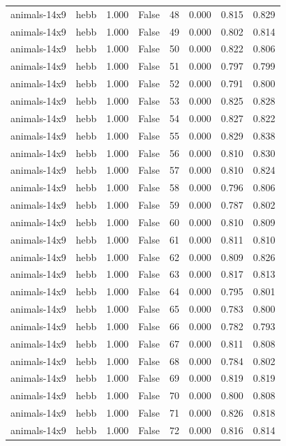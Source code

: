 \begin{tabular}{llrrrrrr}
animals-14x9 & hebb & 1.000 & False & 48 & 0.000 & 0.815 & 0.829 \\
animals-14x9 & hebb & 1.000 & False & 49 & 0.000 & 0.802 & 0.814 \\
animals-14x9 & hebb & 1.000 & False & 50 & 0.000 & 0.822 & 0.806 \\
animals-14x9 & hebb & 1.000 & False & 51 & 0.000 & 0.797 & 0.799 \\
animals-14x9 & hebb & 1.000 & False & 52 & 0.000 & 0.791 & 0.800 \\
animals-14x9 & hebb & 1.000 & False & 53 & 0.000 & 0.825 & 0.828 \\
animals-14x9 & hebb & 1.000 & False & 54 & 0.000 & 0.827 & 0.822 \\
animals-14x9 & hebb & 1.000 & False & 55 & 0.000 & 0.829 & 0.838 \\
animals-14x9 & hebb & 1.000 & False & 56 & 0.000 & 0.810 & 0.830 \\
animals-14x9 & hebb & 1.000 & False & 57 & 0.000 & 0.810 & 0.824 \\
animals-14x9 & hebb & 1.000 & False & 58 & 0.000 & 0.796 & 0.806 \\
animals-14x9 & hebb & 1.000 & False & 59 & 0.000 & 0.787 & 0.802 \\
animals-14x9 & hebb & 1.000 & False & 60 & 0.000 & 0.810 & 0.809 \\
animals-14x9 & hebb & 1.000 & False & 61 & 0.000 & 0.811 & 0.810 \\
animals-14x9 & hebb & 1.000 & False & 62 & 0.000 & 0.809 & 0.826 \\
animals-14x9 & hebb & 1.000 & False & 63 & 0.000 & 0.817 & 0.813 \\
animals-14x9 & hebb & 1.000 & False & 64 & 0.000 & 0.795 & 0.801 \\
animals-14x9 & hebb & 1.000 & False & 65 & 0.000 & 0.783 & 0.800 \\
animals-14x9 & hebb & 1.000 & False & 66 & 0.000 & 0.782 & 0.793 \\
animals-14x9 & hebb & 1.000 & False & 67 & 0.000 & 0.811 & 0.808 \\
animals-14x9 & hebb & 1.000 & False & 68 & 0.000 & 0.784 & 0.802 \\
animals-14x9 & hebb & 1.000 & False & 69 & 0.000 & 0.819 & 0.819 \\
animals-14x9 & hebb & 1.000 & False & 70 & 0.000 & 0.800 & 0.808 \\
animals-14x9 & hebb & 1.000 & False & 71 & 0.000 & 0.826 & 0.818 \\
animals-14x9 & hebb & 1.000 & False & 72 & 0.000 & 0.816 & 0.814 \\

\end{tabular}
